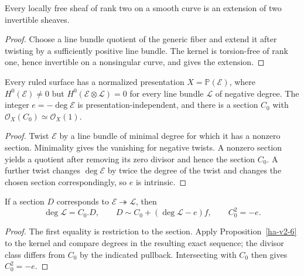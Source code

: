 \begin{corollary}
\label{ha-v2-7}
Every locally free sheaf of rank two on a smooth curve is an extension of two
invertible sheaves.

\end{corollary}
\begin{proof}
Choose a line bundle quotient of the generic fiber and extend it after twisting
by a sufficiently positive line bundle.  The kernel is torsion-free of rank one,
hence invertible on a nonsingular curve, and gives the extension.
\end{proof}

\begin{proposition}
\label{ha-v2-8}
Every ruled surface has a normalized presentation \(X=\mathbb P(\mathcal E)\),
where \(H^0(\mathcal E)\ne0\) but \(H^0(\mathcal E\otimes\mathcal L)=0\) for every
line bundle \(\mathcal L\) of negative degree.  The integer
\(e=-\deg\mathcal E\) is presentation-independent, and there is a section
\(C_0\) with \(\mathcal O_X(C_0)\simeq\mathcal O_X(1)\).

\end{proposition}
\begin{proof}
Twist \(\mathcal E\) by a line bundle of minimal degree for which it has a
nonzero section.  Minimality gives the vanishing for negative twists.  A nonzero
section yields a quotient after removing its zero divisor and hence the section
\(C_0\).  A further twist changes \(\deg\mathcal E\) by twice the degree of
the twist and changes the chosen section correspondingly, so \(e\) is intrinsic.
\end{proof}

\begin{proposition}
\label{ha-v2-9}
If a section \(D\) corresponds to \(\mathcal E\twoheadrightarrow\mathcal L\), then
\[
 \deg\mathcal L=C_0.D,\qquad D\sim C_0+(\deg\mathcal L-e)f,
 \qquad C_0^2=-e.
\]
\end{proposition}
\begin{proof}
The first equality is restriction to the section.  Apply Proposition~\ref{ha-v2-6}
to the kernel and compare degrees in the resulting exact sequence; the divisor
class differs from \(C_0\) by the indicated pullback.  Intersecting with \(C_0\)
then gives \(C_0^2=-e\).
\end{proof}

